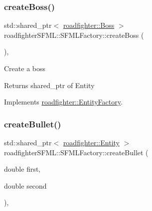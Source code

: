 \mbox{\label{classroadfighterSFML_1_1SFMLFactory_a86f4fed282eebc1556ed1134e7ad7e13}} 
\subsubsection{\texorpdfstring{create\+Boss()}{createBoss()}}
{\footnotesize\ttfamily std\+::shared\+\_\+ptr$<$ \hyperlink{classroadfighter_1_1Boss}{roadfighter\+::\+Boss} $>$ roadfighter\+S\+F\+M\+L\+::\+S\+F\+M\+L\+Factory\+::create\+Boss (\begin{DoxyParamCaption}{ }\end{DoxyParamCaption})\hspace{0.3cm}{\ttfamily [override]}, {\ttfamily [virtual]}}

Create a boss \begin{DoxyReturn}{Returns}
shared\+\_\+ptr of Entity 
\end{DoxyReturn}


Implements \hyperlink{classroadfighter_1_1EntityFactory_ae7a09423660432e744ed35f5f04b0931}{roadfighter\+::\+Entity\+Factory}.

\mbox{\label{classroadfighterSFML_1_1SFMLFactory_aac2ed62453b201da7d124947b6cd475b}} 
\subsubsection{\texorpdfstring{create\+Bullet()}{createBullet()}}
{\footnotesize\ttfamily std\+::shared\+\_\+ptr$<$ \hyperlink{classroadfighter_1_1Entity}{roadfighter\+::\+Entity} $>$ roadfighter\+S\+F\+M\+L\+::\+S\+F\+M\+L\+Factory\+::create\+Bullet (\begin{DoxyParamCaption}\item[{double}]{first,  }\item[{double}]{second }\end{DoxyParamCaption})\hspace{0.3cm}{\ttfamily [override]}, {\ttfamily [virtual]}}

